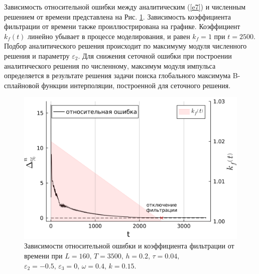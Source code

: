 \documentclass[14pt,a4paper]{extreport}
\begin{document}
			Зависимость относительной ошибки между аналитическим (\ref{e7}) и численным решением от времени представлена на Рис. \ref{fig21_2}. Зависимость коэффициента фильтрации от времени также проиллюстрирована на графике. Коэффициент \(k_{f}\left(t\right)\) линейно убывает в процессе моделирования, и равен \(k_{f}=1\) при \(t=2500\). Подбор аналитического решения происходит по максимуму модуля численного решения и параметру \(\varepsilon_{2}\). Для снижения сеточной ошибки при построении аналитического решения по численному, максимум модуля импульса определяется в результате решения задачи поиска глобального максимума B-сплайновой функции интерполяции, построенной для сеточного решения.

			\begin{figure}[H]
				\begin{center}
					\includegraphics[width=0.5\linewidth]{Medvedev_fig18.png}
					\subcaption{}
				\end{center}
				\caption{Зависимости относительной ошибки и коэффициента фильтрации от времени при
				\(L=160,\, T=3500,\, h=0.2,\, \tau=0.04,\)
				\(\varepsilon_{2}=-0.5,\,\varepsilon_{3}=0,\, \omega=0.4,\, k=0.15\).}
				\label{fig21_2}
			\end{figure}
\end{document}
